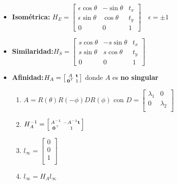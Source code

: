 \documentclass[12pt,a4paper]{article}
\begin{document}
\begin{itemize}
	\item {\bf Isom\'etrica:} $
	H_{E} =
	\left[ {\begin{smallmatrix}
	 \epsilon \cos \theta & -\sin \theta& t_{x} \\
	 \epsilon \sin \theta & \cos \theta& t_{y} \\
	 0 & 0 & 1
	\end{smallmatrix} } \right]
	\quad \epsilon = \pm 1$

	\item {\bf Similaridad:}$
	H_{S} =
	\left[ {\begin{smallmatrix}
	 s \cos \theta & - s \sin \theta& t_{x} \\
	 s \sin \theta & s\cos \theta& t_{y} \\
	 0 & 0 & 1
	\end{smallmatrix} } \right]
	$

	\item {\bf Afinidad:}$
	H_{A} =
	\left[ {\begin{smallmatrix}
	 A & {\bf t}\\
	 {\bf 0}^{T} & 1 \\
	\end{smallmatrix} } \right]
	$ donde $A$ es {\bf no singular}

	\begin{enumerate}
		\item $A = R(\theta)R(-\phi)DR(\phi)$ con $D = \left[ {\begin{smallmatrix}
		 \lambda_{1} & 0\\
		 0 & \lambda_{2}\\
		\end{smallmatrix} } \right]$

		\item $
		H_{A}^{-1} =
		\left[ {\begin{smallmatrix}
		 A^{-1} & -A^{-1}{\bf t}\\
		 {\bf 0}^{\top} & 1 \\
		\end{smallmatrix} } \right]
		$

		\item $l_{\infty} = \left[ {\begin{smallmatrix}
		 0\\
		 0\\
		 1\\
		\end{smallmatrix} } \right]$

		\item $l_{\infty} = H_{A} l_{\infty}$


\end{enumerate}
\end{itemize}
\end{document}
